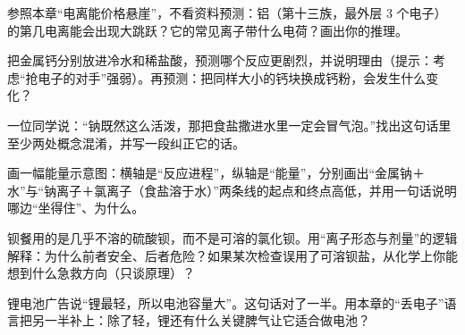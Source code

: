 \begin{sikaoti}
\item 参照本章“电离能价格悬崖”，不看资料预测：铝（第十三族，最外层 3 个电子）的第几电离能会出现大跳跃？它的常见离子带什么电荷？画出你的推理。
\item 把金属钙分别放进冷水和稀盐酸，预测哪个反应更剧烈，并说明理由（提示：考虑“抢电子的对手”强弱）。再预测：把同样大小的钙块换成钙粉，会发生什么变化？
\item 一位同学说：“钠既然这么活泼，那把食盐撒进水里一定会冒气泡。”找出这句话里至少两处概念混淆，并写一段纠正它的话。
\item 画一幅能量示意图：横轴是“反应进程”，纵轴是“能量”，分别画出“金属钠＋水”与“钠离子＋氯离子（食盐溶于水）”两条线的起点和终点高低，并用一句话说明哪边“坐得住”、为什么。
\item 钡餐用的是几乎不溶的硫酸钡，而不是可溶的氯化钡。用“离子形态与剂量”的逻辑解释：为什么前者安全、后者危险？如果某次检查误用了可溶钡盐，从化学上你能想到什么急救方向（只谈原理）？
\item 锂电池广告说“锂最轻，所以电池容量大”。这句话对了一半。用本章的“丢电子”语言把另一半补上：除了轻，锂还有什么关键脾气让它适合做电池？
\end{sikaoti}
